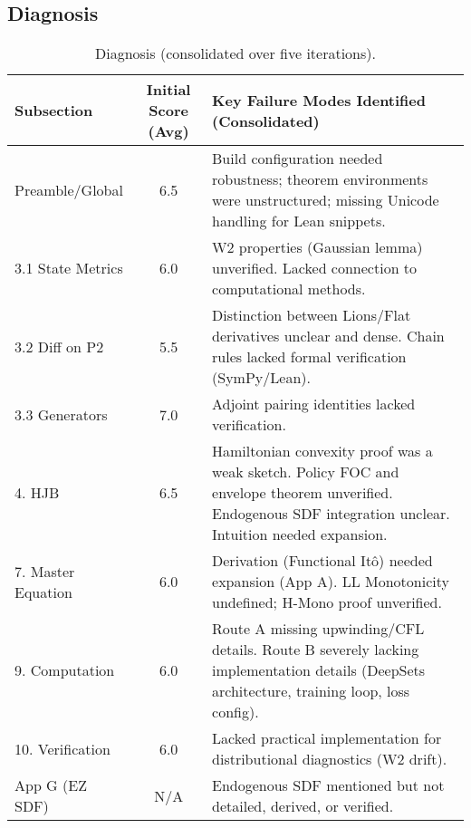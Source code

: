 ﻿\documentclass[11pt,letterpaper,oneside]{article}
\numberwithin{equation}{section}
\newcommand{\1}{\mathbf{1}}
\begin{document}
\begin{tcolorbox}[didacticstyle]
\begin{itemize}[leftmargin=1.1em,itemsep=0.25em]
\subsection*{Diagnosis}
\begin{table}[h]
\centering
\small
\begin{tabularx}{\textwidth}{@{}l c X@{}}
\toprule
\textbf{Subsection} & \textbf{Initial Score (Avg)} & \textbf{Key Failure Modes Identified (Consolidated)} \\
\midrule
Preamble/Global & 6.5 & Build configuration needed robustness; theorem environments were unstructured; missing Unicode handling for Lean snippets. \\
3.1 State Metrics & 6.0 & W2 properties (Gaussian lemma) unverified. Lacked connection to computational methods. \\
3.2 Diff on P2 & 5.5 & Distinction between Lions/Flat derivatives unclear and dense. Chain rules lacked formal verification (SymPy/Lean). \\
3.3 Generators & 7.0 & Adjoint pairing identities lacked verification. \\
4. HJB & 6.5 & Hamiltonian convexity proof was a weak sketch. Policy FOC and envelope theorem unverified. Endogenous SDF integration unclear. Intuition needed expansion. \\
7. Master Equation & 6.0 & Derivation (Functional Itô) needed expansion (App A). LL Monotonicity undefined; H-Mono proof unverified. \\
9. Computation & 6.0 & Route A missing upwinding/CFL details. Route B severely lacking implementation details (DeepSets architecture, training loop, loss config). \\
10. Verification & 6.0 & Lacked practical implementation for distributional diagnostics (W2 drift). \\
App G (EZ SDF) & N/A & Endogenous SDF mentioned but not detailed, derived, or verified. \\
\bottomrule
\end{tabularx}
\caption{Diagnosis (consolidated over five iterations).}
\end{table}


\end{itemize}
\end{tcolorbox}
\end{document}
